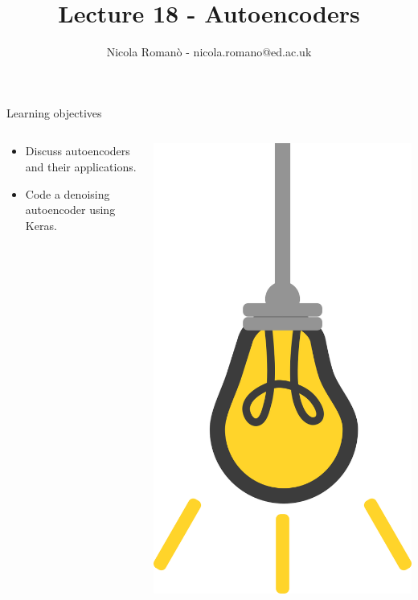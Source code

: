 \documentclass[9pt, aspectratio=169]{beamer}
\author{Nicola Roman\`o - nicola.romano@ed.ac.uk}
\title{Lecture 18 - Autoencoders}
\date{}
\begin{document}

\begin{frame}
    \titlepage
\end{frame}

\begin{frame}
    {Learning objectives}
    \begin{columns}
        \begin{column}{0.8\textwidth}
            \begin{itemize}
                \item Discuss autoencoders and their applications.
                \item Code a denoising autoencoder using Keras.
            \end{itemize}
        \end{column}
        \begin{column}{0.2\textwidth}
            \includegraphics[angle=-30, origin=tr, width=1.5\textwidth]{lightbulb.png}

\end{column}
\end{columns}
\end{frame}
\end{document}
